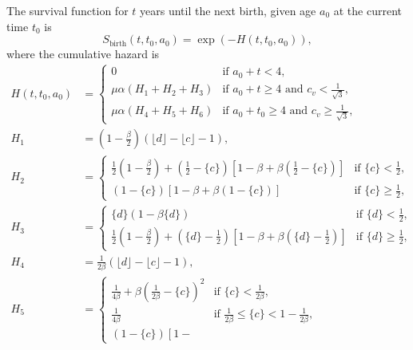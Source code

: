 \documentclass{article}
\begin{document}
The survival function for $t$ years until the next birth, given age
$a_0$ at the current time $t_0$ is
\begin{equation}
  S_{\text{birth}}(t, t_0, a_0) = \exp\left(- H(t, t_0, a_0)\right),
\end{equation}
where the cumulative hazard is
\begin{align}
  H(t, t_0, a_0) &=
  \begin{cases}
    0 & \text{if $a_0 + t < 4$},
    \\
    \mu \alpha \left(H_1 + H_2  + H_3\right)
    & \text{if $a_0 + t \geq 4$ and $c_v < \frac{1}{\sqrt{3}}$},
    \\
    \mu \alpha \left(H_4 + H_5 + H_6\right)
    & \text{if $a_0 + t_0 \geq 4$ and $c_v \geq \frac{1}{\sqrt{3}}$},
  \end{cases}
  \\
  H_1 &= \left(1 - \frac{\beta}{2}\right)
  \left(\lfloor d \rfloor - \lfloor c \rfloor - 1\right),
  \\
  H_2 &=
  \begin{cases}
    \frac{1}{2} \left(1 - \frac{\beta}{2}\right)
    + \left(\frac{1}{2} - \{c\}\right)
    \left[1 - \beta
      + \beta \left(\frac{1}{2} - \{c\}\right)\right]
    & \text{if $\{c\} < \frac{1}{2}$},
    \\
    \left(1 - \{c\}\right)
    \left[1 - \beta + \beta \left(1 - \{c\}\right)\right]
    & \text{if $\{c\} \geq \frac{1}{2}$},
  \end{cases}
  \\
  H_3 &=
  \begin{cases}
    \{d\}\left(1 - \beta \{d\}\right)
    & \text{if $\{d\} < \frac{1}{2}$},
    \\
    \frac{1}{2} \left(1 - \frac{\beta}{2}\right)
    + \left(\{d\} - \frac{1}{2}\right)
    \left[1 - \beta
      + \beta \left(\{d\} - \frac{1}{2}\right)\right]
    & \text{if $\{d\} \geq \frac{1}{2}$},
    \end{cases}
  \\
  H_4 &= \frac{1}{2 \beta}
  \left(\lfloor d \rfloor - \lfloor c \rfloor - 1\right),
  \\
  H_5 &=
  \begin{cases}
    \frac{1}{4 \beta}
    + \beta \left(\frac{1}{2 \beta} - \{c\}\right)^2
    & \text{if $\{c\} < \frac{1}{2 \beta}$},
    \\
    \frac{1}{4 \beta}
    & \text{if $\frac{1}{2 \beta} \leq \{c\} < 1 - \frac{1}{2 \beta}$},
    \\
    \left(1 - \{c\}\right) \left[1 -

\end{cases}
\end{align}
\end{document}
